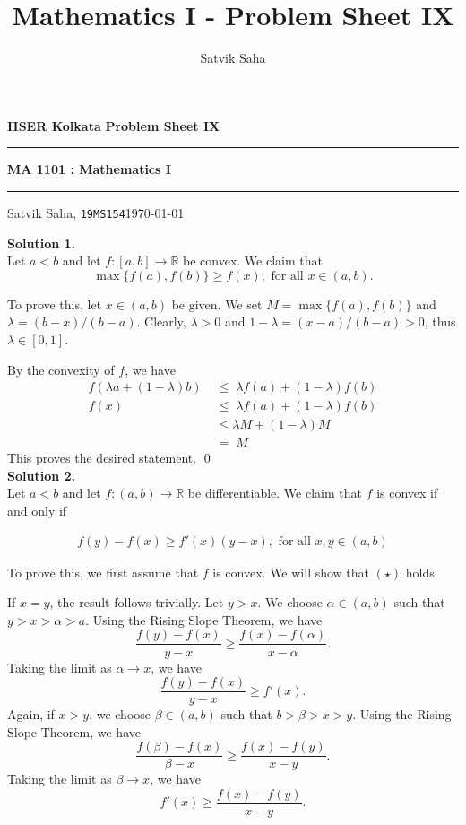 \documentclass[10pt]{article}
\title{Mathematics I - Problem Sheet IX}
\author{Satvik Saha}
\date{}
\begin{document}
        \par\textbf{IISER Kolkata} \hfill \textbf{Problem Sheet IX}
        \vspace{3pt}
        \hrule
        \vspace{3pt}
        \begin{center}
                \LARGE{\textbf{MA 1101 : Mathematics I}}
        \end{center}
        \vspace{3pt}
        \hrule
        \vspace{3pt}
        Satvik Saha, \texttt{19MS154}\hfill\today
        \vspace{20pt}

        \textbf{Solution 1.}\\
        Let $a < b$ and let $f\colon [a, b] \to \mathbb{R}$ be convex. We claim that
        \[\max\{f(a), f(b)\} \ge f(x), \text{ for all } x \in (a, b).\]

        To prove this, let $x \in (a, b)$ be given. We set $M = \max\{f(a), f(b)\}$ and $\lambda = (b - x)/(b - a)$.
        Clearly, $\lambda > 0$ and $1 - \lambda = (x - a)/(b - a) > 0$, thus $\lambda \in [0, 1]$.

        By the convexity of $f$, we have
        \begin{align*}
                f(\lambda a + (1 - \lambda)b) \;&\le\; \lambda f(a) + (1 - \lambda)f(b) \\
                f(x) \;&\le\; \lambda f(a) + (1 - \lambda)f(b) \\
                        \;&\le \lambda M + (1 - \lambda)M \\
                        \;&=\; M
        \end{align*}
        This proves the desired statement. \qed\\

        \textbf{Solution 2.}\\
        Let $a < b$ and let $f \colon (a, b) \to \mathbb{R}$ be differentiable. We claim that $f$ is convex if and only if 
        
        \begin{align*}
        f(y) - f(x) \ge f'(x)(y - x), \text{ for all } x, y \in (a, b) \tag{$\star$}
        \end{align*}

        To prove this, we first assume that $f$ is convex. We will show that $(\star)$ holds.

        If $x = y$, the result follows trivially. Let $y > x$.
        We choose $\alpha \in (a, b)$ such that $y > x > \alpha > a$. Using the Rising Slope Theorem, we have
        \[\frac{f(y) - f(x)}{y - x} \ge \frac{f(x) - f(\alpha)}{x - \alpha}.\]
        Taking the limit as $\alpha \to x$, we have
        \[\frac{f(y) - f(x)}{y - x} \ge f'(x).\]
        Again, if $x > y$, we choose $\beta \in (a, b)$ such that $b > \beta > x > y$. Using the Rising Slope Theorem, we have
        \[\frac{f(\beta) - f(x)}{\beta - x} \ge \frac{f(x) - f(y)}{x - y}.\]
        Taking the limit as $\beta \to x$, we have
        \[f'(x) \ge \frac{f(x) - f(y)}{x - y}.\]
        
\end{document}
